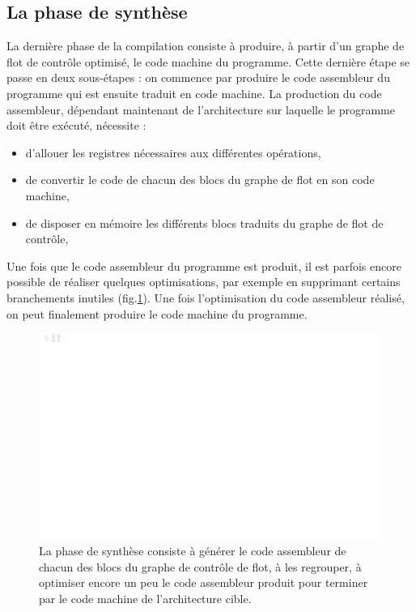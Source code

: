 \subsection{La phase de synthèse}

La dernière phase de la compilation consiste à produire, à partir d'un graphe de flot de contrôle optimisé, le code machine du programme. Cette dernière étape se passe en deux sous-étapes : on commence par produire le code assembleur du programme qui est ensuite traduit en code machine. La production du code assembleur, dépendant maintenant de l'architecture sur laquelle le programme doit être exécuté, nécessite :
\begin{itemize}
\item d'allouer les registres nécessaires aux différentes opérations,
\item de convertir le code de chacun des blocs du graphe de flot en son code machine,
\item de disposer en mémoire les différents blocs traduits du graphe de flot de contrôle,
\end{itemize}

Une fois que le code assembleur du programme est produit, il est parfois encore possible de réaliser quelques optimisations, par exemple en supprimant certains branchements inutiles (fig.\ref{fig:compilation_synthese}). Une fois l'optimisation du code assembleur réalisé, on peut finalement produire le code machine du programme.

\begin{figure}[htbp]
\centering\includegraphics[width=\columnwidth]{Figs/compilation_synthese.pdf}
\caption{\label{fig:compilation_synthese} La phase de synthèse consiste à générer le code assembleur de chacun des blocs du graphe de contrôle de flot, à les regrouper, à optimiser encore un peu le code assembleur produit pour terminer par le code machine de l'architecture cible.}
\end{figure}



